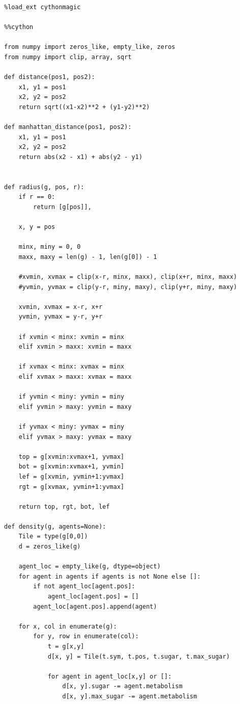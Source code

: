 \begin{verbatim}
%load_ext cythonmagic

%%cython

from numpy import zeros_like, empty_like, zeros
from numpy import clip, array, sqrt

def distance(pos1, pos2):
    x1, y1 = pos1
    x2, y2 = pos2
    return sqrt((x1-x2)**2 + (y1-y2)**2)  

def manhattan_distance(pos1, pos2):
    x1, y1 = pos1
    x2, y2 = pos2
    return abs(x2 - x1) + abs(y2 - y1)


def radius(g, pos, r):
    if r == 0:
        return [g[pos]],
    
    x, y = pos
    
    minx, miny = 0, 0
    maxx, maxy = len(g) - 1, len(g[0]) - 1

    #xvmin, xvmax = clip(x-r, minx, maxx), clip(x+r, minx, maxx)
    #yvmin, yvmax = clip(y-r, miny, maxy), clip(y+r, miny, maxy)
    
    xvmin, xvmax = x-r, x+r
    yvmin, yvmax = y-r, y+r
    
    if xvmin < minx: xvmin = minx
    elif xvmin > maxx: xvmin = maxx
    
    if xvmax < minx: xvmax = minx
    elif xvmax > maxx: xvmax = maxx
        
    if yvmin < miny: yvmin = miny
    elif yvmin > maxy: yvmin = maxy
        
    if yvmax < miny: yvmax = miny
    elif yvmax > maxy: yvmax = maxy     

    top = g[xvmin:xvmax+1, yvmax]
    bot = g[xvmin:xvmax+1, yvmin]
    lef = g[xvmin, yvmin+1:yvmax]
    rgt = g[xvmax, yvmin+1:yvmax]
    
    return top, rgt, bot, lef

def density(g, agents=None):
    Tile = type(g[0,0])
    d = zeros_like(g)

    agent_loc = empty_like(g, dtype=object)
    for agent in agents if agents is not None else []:
        if not agent_loc[agent.pos]:
            agent_loc[agent.pos] = []
        agent_loc[agent.pos].append(agent)
        
    for x, col in enumerate(g):
        for y, row in enumerate(col):
            t = g[x,y]
            d[x, y] = Tile(t.sym, t.pos, t.sugar, t.max_sugar)
            
            for agent in agent_loc[x,y] or []:
                d[x, y].sugar -= agent.metabolism
                d[x, y].max_sugar -= agent.metabolism
                

\end{verbatim}
